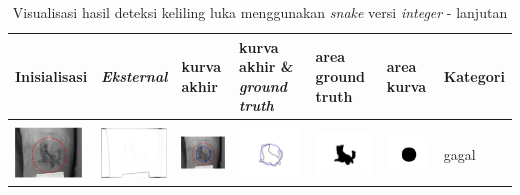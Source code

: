 \begin{table}[H]
	\centering
	\caption{Visualisasi hasil deteksi keliling luka menggunakan \emph{snake} versi \emph{integer} - lanjutan}
	\label{tabel_hasil_10}
	\begin{tabular}{|m{0.7in}|m{0.7in}|m{0.7in}|m{0.7in}|m{0.7in}|m{0.7in}|m{0.7in}|}
		\hline
		\textbf{Inisialisasi} & \textbf{\emph{Eksternal}} & \textbf{kurva akhir} & \textbf{kurva akhir \& \emph{ground truth}}& \textbf{area ground truth} & \textbf{area kurva} & \textbf{Kategori} \\
		\hline
		
		&  &  & & & &  \\
		\includegraphics[width=0.7in]{dataset/dataset_3/luka_merah/ready/38_integer_init.jpg}&
		\includegraphics[width=0.7in]{dataset/dataset_3/luka_merah/ready/38_integer_ext.jpg}&
		\includegraphics[width=0.7in]{dataset/dataset_3/luka_merah/ready/38_integer_result.jpg}&
		\includegraphics[width=0.7in]{dataset/dataset_3/luka_merah/ready/38_gt_r_integer.jpg}&
		\includegraphics[width=0.7in]{dataset/dataset_3/luka_merah/ready/38_r.jpg}&
		\includegraphics[width=0.7in]{dataset/dataset_3/luka_merah/ready/38_integer_r.jpg}&
		gagal\\
		\hline
		

\end{tabular}
\end{table}
